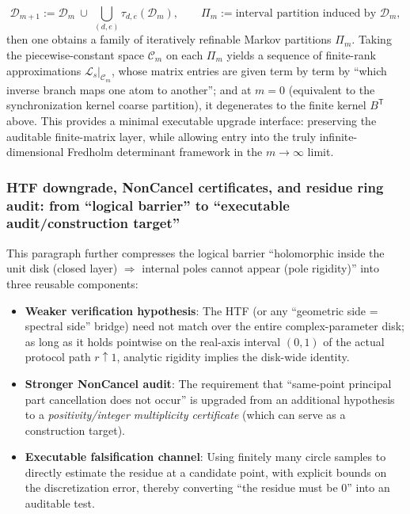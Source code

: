\begin{remark}
\[
\mathcal{D}_{m+1}:=\mathcal{D}_m\ \cup\ \bigcup_{(d,e)}\tau_{d,e}(\mathcal{D}_m),
\qquad
\Pi_m:=\text{interval partition induced by }\mathcal{D}_m,
\]
then one obtains a family of iteratively refinable Markov partitions \(\Pi_m\). Taking the piecewise-constant space \(\mathcal{C}_m\) on each \(\Pi_m\) yields a sequence of finite-rank approximations
\(
\mathcal{L}_s|_{\mathcal{C}_m}
\),
whose matrix entries are given term by term by ``which inverse branch maps one atom to another''; and at \(m=0\) (equivalent to the synchronization kernel coarse partition), it degenerates to the finite kernel \(B^{\mathsf T}\) above.
This provides a minimal executable upgrade interface: preserving the auditable finite-matrix layer, while allowing entry into the truly infinite-dimensional Fredholm determinant framework in the \(m\to\infty\) limit.
\end{remark}

\subsubsection{HTF downgrade, NonCancel certificates, and residue ring audit: from ``logical barrier'' to ``executable audit/construction target''}\label{subsec:htf-downgrade-audit-constructive}
This paragraph further compresses the logical barrier ``holomorphic inside the unit disk (closed layer) $\Rightarrow$ internal poles cannot appear (pole rigidity)'' into three reusable components:
\begin{itemize}
  \item \textbf{Weaker verification hypothesis}: The HTF (or any ``geometric side = spectral side'' bridge) need not match over the entire complex-parameter disk; as long as it holds pointwise on the real-axis interval \((0,1)\) of the actual protocol path \(r\uparrow 1\), analytic rigidity implies the disk-wide identity.
  \item \textbf{Stronger NonCancel audit}: The requirement that ``same-point principal part cancellation does not occur'' is upgraded from an additional hypothesis to a \emph{positivity/integer multiplicity certificate} (which can serve as a construction target).
  \item \textbf{Executable falsification channel}: Using finitely many circle samples to directly estimate the residue at a candidate point, with explicit bounds on the discretization error, thereby converting ``the residue must be \(0\)'' into an auditable test.
\end{itemize}

